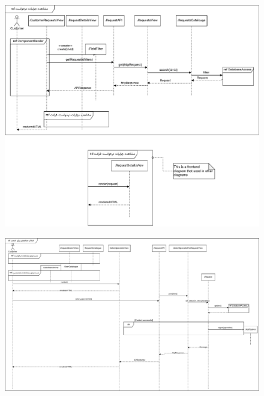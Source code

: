 \begin{figure}[ht!]
	\centering
	\includegraphics[scale=0.8]{figs/design-sequence/3-11.pdf}
\end{figure}
\FloatBarrier
\newpage


\eject \pdfpagewidth=16in \pdfpageheight=10in
\begin{figure}[ht!]
	\centering
	\includegraphics[scale=0.8]{figs/design-sequence/3-12.pdf}
\end{figure}
\FloatBarrier
\newpage


